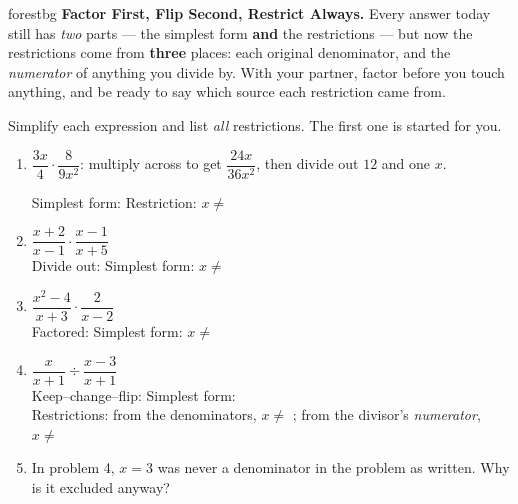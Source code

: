 \documentclass[10pt]{article}
\begin{document}
\namepartnerperiod

\vspace{0.08in}

\begin{headlinebox}{forestbg}
\small\textbf{Factor First, Flip Second, Restrict Always.} Every answer today still has \emph{two}
parts --- the simplest form \textbf{and} the restrictions --- but now the restrictions come from
\textbf{three} places: each original denominator, and the \emph{numerator} of anything you divide by.
With your partner, factor before you touch anything, and be ready to say which source each restriction
came from.
\end{headlinebox}

\vspace{0.06in}

\begin{tcolorbox}[colback=white, colframe=black!40, title=\textbf{Tier R --- Remediate},
    fonttitle=\bfseries, arc=1.5mm, left=3mm, right=3mm, top=2mm, bottom=2mm, breakable]
Simplify each expression and list \emph{all} restrictions. The first one is started for you.

\vspace{4pt}
\begin{enumerate}[leftmargin=1.9em, itemsep=9pt]
  \item $\dfrac{3x}{4}\cdot\dfrac{8}{9x^2}$: \; multiply across to get $\dfrac{24x}{36x^2}$, then
        divide out $12$ and one $x$.

        Simplest form:  \quad Restriction: $x\neq$ 
  \item $\dfrac{x+2}{x-1}\cdot\dfrac{x-1}{x+5}$ \\[3pt]
        Divide out:  \quad Simplest form:  \quad
        $x\neq$ 
  \item $\dfrac{x^2-4}{x+3}\cdot\dfrac{2}{x-2}$ \\[3pt]
        Factored:  \quad Simplest form:  \quad
        $x\neq$ 
  \item $\dfrac{x}{x+1}\div\dfrac{x-3}{x+1}$ \\[3pt]
        Keep--change--flip:  \quad Simplest form:  \\[3pt]
        Restrictions: from the denominators, $x\neq$ ; \; from the divisor's
        \emph{numerator}, $x\neq$ 
  \item In problem 4, $x=3$ was never a denominator in the problem as written. Why is it excluded
        anyway? 
\end{enumerate}
\end{tcolorbox}
\end{document}
